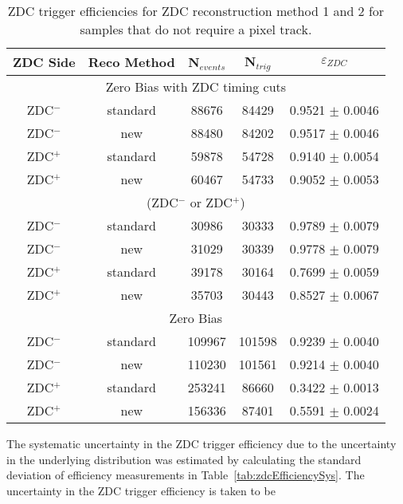       \begin{table}
        \centering
        \begin{tabular}{|c|c|c|c|c|}
          \hline ZDC Side & Reco Method & N$_{events}$ & N$_{trig}$ & $\varepsilon_{ZDC}$ \\ \hline
          \multicolumn{5}{|c|}{ Zero Bias with ZDC timing cuts} \\ \hline 
           ZDC$^{-}$ & standard & 88676  & 84429  & 0.9521 $\pm$ 0.0046 \\ \hline
           ZDC$^{-}$ & new & 88480  & 84202  & 0.9517 $\pm$ 0.0046 \\ \hline
           ZDC$^{+}$ & standard & 59878  & 54728  & 0.9140  $\pm$ 0.0054 \\ \hline
           ZDC$^{+}$ & new & 60467  & 54733  & 0.9052  $\pm$ 0.0053 \\ \hline
           \multicolumn{5}{|c|}{(ZDC$^{-}$ or ZDC$^{+}$)} \\ \hline 
           ZDC$^{-}$ & standard & 30986 & 30333 & 0.9789 $\pm$ 0.0079 \\ \hline
           ZDC$^{-}$ & new & 31029 & 30339 & 0.9778 $\pm$ 0.0079 \\ \hline
           ZDC$^{+}$ & standard & 39178 & 30164 & 0.7699 $\pm$ 0.0059 \\ \hline
           ZDC$^{+}$ & new & 35703 & 30443 & 0.8527 $\pm$ 0.0067 \\ \hline
           \multicolumn{5}{|c|}{ Zero Bias} \\ \hline 
           ZDC$^{-}$ & standard & 109967  & 101598  & 0.9239 $\pm$ 0.0040 \\ \hline
           ZDC$^{-}$ & new & 110230  & 101561  & 0.9214 $\pm$ 0.0040 \\ \hline
           ZDC$^{+}$ & standard & 253241  & 86660  & 0.3422 $\pm$ 0.0013 \\ \hline
           ZDC$^{+}$ & new & 156336  & 87401  & 0.5591 $\pm$ 0.0024 \\ \hline
         \end{tabular}
        \caption{ZDC trigger efficiencies for ZDC reconstruction method 1 and 
          2 for samples that do not require a pixel track.}
        \label{tab:zdcEfficiencySysNoiseSample}
      \end{table}

      The systematic uncertainty in the ZDC trigger efficiency due to the 
        uncertainty in the underlying distribution was estimated by calculating 
        the standard deviation of efficiency measurements in Table~\ref{tab:zdcEfficiencySys}.
      The uncertainty in the ZDC trigger efficiency is taken to be \DIFaddbegin {}\DIFaddend 


